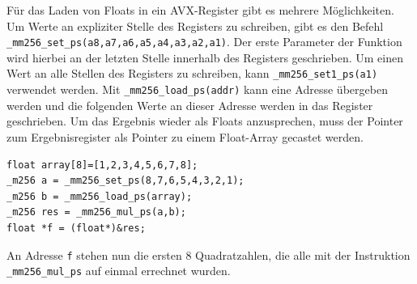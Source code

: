 \documentclass[../main.tex]{subfiles}
\begin{document}
Für das Laden von Floats in ein AVX-Register gibt es mehrere Möglichkeiten. Um Werte an expliziter Stelle des Registers zu schreiben, gibt es den Befehl \texttt{\_mm256\_set\_ps(a8,a7,a6,a5,a4,a3,a2,a1)}. Der erste Parameter der Funktion wird hierbei an der letzten Stelle innerhalb des Registers geschrieben. Um einen Wert an alle Stellen des Registers zu schreiben, kann \texttt{\_mm256\_set1\_ps(a1)} verwendet werden. Mit \texttt{\_mm256\_load\_ps(addr)} kann eine Adresse übergeben werden und die folgenden Werte an dieser Adresse werden in das Register geschrieben. 
Um das Ergebnis wieder als Floats anzusprechen, muss der Pointer zum Ergebnisregister als Pointer zu einem Float-Array gecastet werden.

\begin{lstlisting}
float array[8]=[1,2,3,4,5,6,7,8];
_m256 a = _mm256_set_ps(8,7,6,5,4,3,2,1);
_m256 b = _mm256_load_ps(array);
_m256 res = _mm256_mul_ps(a,b);
float *f = (float*)&res;
\end{lstlisting}
An Adresse \texttt{f} stehen nun die ersten 8 Quadratzahlen, die alle mit der Instruktion \texttt{\_mm256\_mul\_ps} auf einmal errechnet wurden.
\end{document}
